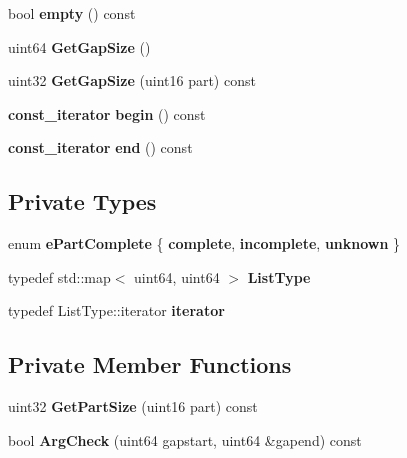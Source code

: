 \begin{DoxyCompactItemize}
\item 
bool {\bfseries empty} () const \label{classCGapList_a523e1ba374bb928adb701962e68ea587}

\item 
uint64 {\bfseries GetGapSize} ()\label{classCGapList_a9407a9419db983ad99ab4763ee1298ea}

\item 
uint32 {\bfseries GetGapSize} (uint16 part) const \label{classCGapList_a1c1079098d88b5bb4b70e3b1799bf25d}

\item 
{\bf const\_\-iterator} {\bfseries begin} () const \label{classCGapList_a97f24803be17e8e9a14978349ea7ee48}

\item 
{\bf const\_\-iterator} {\bfseries end} () const \label{classCGapList_a803bbeee8a361fe95dd3c518a7188e75}

\end{DoxyCompactItemize}
\subsection*{Private Types}
\begin{DoxyCompactItemize}
\item 
enum {\bfseries ePartComplete} \{ {\bfseries complete}, 
{\bfseries incomplete}, 
{\bfseries unknown}
 \}
\item 
typedef std::map$<$ uint64, uint64 $>$ {\bfseries ListType}\label{classCGapList_aa36dc5f8d4a6a6bdf13c769ad86ff6f8}

\item 
typedef ListType::iterator {\bfseries iterator}\label{classCGapList_a1dd257b3fb5997863f3d34a90bac56e8}

\end{DoxyCompactItemize}
\subsection*{Private Member Functions}
\begin{DoxyCompactItemize}
\item 
uint32 {\bfseries GetPartSize} (uint16 part) const \label{classCGapList_aec281ea0cdcf0e60a5f3267860f58ebb}

\item 
bool {\bfseries ArgCheck} (uint64 gapstart, uint64 \&gapend) const \label{classCGapList_ac909a303dc3966774ec59fc1e94fbedc}

\end{DoxyCompactItemize}

